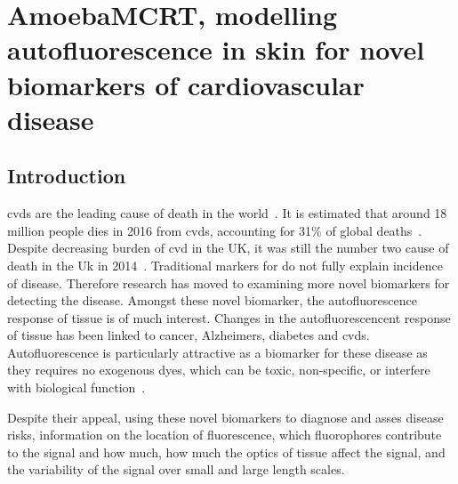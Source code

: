 \chapter{AmoebaMCRT, modelling autofluorescence in skin for novel biomarkers of cardiovascular disease}
\label{chap:salvo}
\section{Introduction}


\Gls*{cvds} are the leading cause of death in the world~\cite{whodeath}.
It is estimated that around 18 million people dies in 2016 from \gls*{cvds}, accounting for 31\% of global deaths~\cite{whodeath}.
Despite decreasing burden of \gls*{cvd} in the UK, it was still the number two cause of death in the Uk in 2014~\cite{bhatnagar2016trends}.
Traditional markers for do not fully explain incidence of disease.
Therefore research has moved to examining more novel biomarkers for detecting the disease.
Amongst these novel biomarker, the autofluorescence response of tissue is of much interest.
Changes in the autofluorescencent response of tissue has been linked to cancer, Alzheimers, diabetes and \gls*{cvds}.
Autofluorescence is particularly attractive as a biomarker for these disease as they requires no exogenous dyes, which can be toxic, non-specific, or interfere with biological function~\cite{kollias1998endogenous}.


Despite their appeal, using these novel biomarkers to diagnose and asses disease risks, information on the location of fluorescence, which fluorophores contribute to the signal and how much, how much the optics of tissue affect the signal, and the variability of the signal over small and large length scales.







